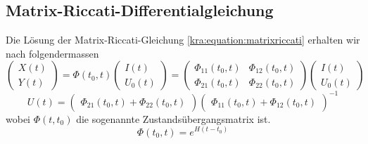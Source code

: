 \subsection{Matrix-Riccati-Differentialgleichung} \label{kra:loesung:riccati}
Die Lösung der Matrix-Riccati-Gleichung \ref{kra:equation:matrixriccati} erhalten wir nach \cite{kra:kalmanisae} folgendermassen
\begin{equation}
    \label{kra:matrixriccati-solution}
    \begin{pmatrix}
        X(t) \\
        Y(t)
    \end{pmatrix}
    =
    \Phi(t_0, t)
    \begin{pmatrix}
        I(t) \\
        U_0(t)
    \end{pmatrix}
    =
    \begin{pmatrix}
        \Phi_{11}(t_0, t) & \Phi_{12}(t_0, t) \\
        \Phi_{21}(t_0, t) & \Phi_{22}(t_0, t)
    \end{pmatrix}
    \begin{pmatrix}
        I(t) \\
        U_0(t)
    \end{pmatrix}
\end{equation}
\begin{equation}
    U(t) =
    \begin{pmatrix}
        \Phi_{21}(t_0, t) + \Phi_{22}(t_0, t)
    \end{pmatrix}
    \begin{pmatrix}
        \Phi_{11}(t_0, t) + \Phi_{12}(t_0, t)
    \end{pmatrix}
    ^{-1}
\end{equation}
wobei $\Phi(t, t_0)$ die sogenannte Zustandsübergangsmatrix ist.
\begin{equation}
    \Phi(t_0, t) = e^{H(t - t_0)}
\end{equation}
